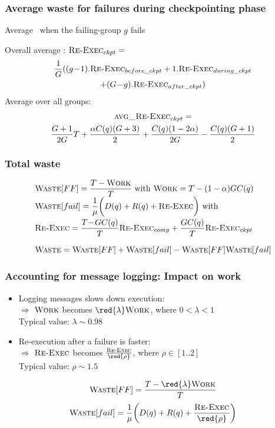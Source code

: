 \begin{frame}
  \frametitle{Average waste for failures during checkpointing
    phase}
  
  Average \Overhead\ when the failing-group $g$ fails

  Overall average \Overhead: $\textsc{Re-Exec}_{ckpt} = $\\[-5mm]
  \begin{multline*}
    \frac{1}{G} ( (g\!-\!1) . \textsc{Re-Exec}_{before\_ckpt} +
      1.  \textsc{Re-Exec}_{during\_ckpt}\\ + (G\!-\!g) . \textsc{Re-Exec}_{after\_ckpt})
  \end{multline*}
  \vfill
    Average over all groups:
    \begin{multline*}
      \textsc{avg\_\textsc{Re-Exec}}_{ckpt} =\\ \frac{G+1}{2G}T + \frac{\alpha
        C(q)(G+3)}{2}+\frac{C(q)(1-2\alpha)}{2G} -\frac{C(q)(G+1)}{2}
    \end{multline*}
\end{frame}

\begin{frame}
  \frametitle{Total waste}
  
  $$
  \begin{array}{l}
    \displaystyle \textsc{Waste}[FF] =  \frac{T-\textsc{Work}}{T} \text{ with } \textsc{Work} = T - (1-\alpha) G C(q)\\
    \displaystyle \textsc{Waste}[fail] = \frac{1}{\mu} \bigg( D(q) + R(q) + \textsc{Re-Exec} \bigg) \text{ with } \\[3mm]
    \displaystyle \textsc{Re-Exec} =   \frac{T\!-\!GC(q)}{T} \textsc{Re-Exec}_{comp} +  \frac{GC(q)}{T} \textsc{Re-Exec}_{ckpt} \\[5mm]
      \displaystyle \textsc{Waste} = \textsc{Waste}[FF] + \textsc{Waste}[fail] - \textsc{Waste}[FF] \textsc{Waste}[fail]
 \end{array}
 $$ 
\end{frame}

\begin{frame}
  \frametitle{Accounting for message logging: Impact on work}

 \begin{itemize}
  \item \frownie Logging messages slows down execution:\\
  $\Rightarrow$ $\textsc{Work}$ becomes $\red{\lambda} \Work$, where $0 < \lambda <1$\\
  Typical value: $ \lambda \sim 0.98$

  \item \smiley Re-execution after a failure is faster:\\
  $\Rightarrow$ $\textsc{Re-Exec}$ becomes $\frac{\Overhead}{\red{\rho}}$, where $\rho \in[1..2]$\\
   Typical value: $ \rho \sim 1.5$
  
  \end{itemize}

\vfill
$$\Waste[FF] = \frac{\T - \red{\lambda} \Work}{\T}$$
$$\Waste[fail] = \frac{1}{\muplatform} \bigg( \dgroup + \rgroup + 
\frac{\Overhead}{\red{\rho}} \bigg) $$
\end{frame}


